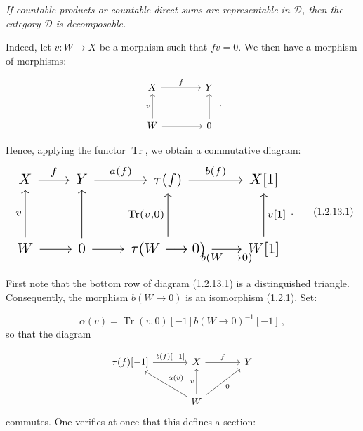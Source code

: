 \clearpage
{}%
\begingroup
\small
\setlength{\emergencystretch}{1.5em}%
\setlength{\abovedisplayskip}{4pt plus 2pt minus 2pt}%
\setlength{\belowdisplayskip}{4pt plus 2pt minus 2pt}%

\textit{If countable products or countable direct sums are representable
in $\mathcal D$, then the category $\mathcal D$ is decomposable.}

Indeed, let $v\colon W\longrightarrow X$ be a morphism such that $fv=0$.
We then have a morphism of morphisms:

\[
  \begin{tikzcd}[column sep=4em,row sep=2.5em]
    X \arrow[r,"f"] & Y \\
    W \arrow[u,"v"] \arrow[r] & 0 \arrow[u]
  \end{tikzcd}
  \,.
\]

Hence, applying the functor $\operatorname{Tr}$, we obtain a commutative
diagram:
\begin{equation}
  \resizebox{0.82\linewidth}{!}{%
    $\begin{tikzcd}[ampersand replacement=\&,column sep=2.05em,row sep=3em]
      X \arrow[r,"f"]
        \& Y \arrow[r,"{a(f)}"]
        \& \tau(f) \arrow[r,"{b(f)}"]
        \& X[1] \\
      W \arrow[u,"v"] \arrow[r]
        \& 0 \arrow[u] \arrow[r]
        \& \tau(W\longrightarrow 0) \arrow[u,"{\operatorname{Tr}(v,0)}"]
          \arrow[r,"{b(W\longrightarrow 0)}"']
        \& W[1] \arrow[u,"{v[1]}"']
    \end{tikzcd}$%
  }\,.
  \tag{1.2.13.1}
\end{equation}

First note that the bottom row of diagram (1.2.13.1) is a distinguished
triangle. Consequently, the morphism $b(W\longrightarrow 0)$ is an
isomorphism (1.2.1). Set:

\[
  \alpha(v)=\operatorname{Tr}(v,0)[-1]
  b(W\longrightarrow 0)^{-1}[-1]\,,
\]
so that the diagram

\[
  \begin{tikzcd}[column sep=3.5em,row sep=2.4em]
    \tau(f)[-1] \arrow[r,"{b(f)[-1]}"]
      & X \arrow[r,"f"]
      & Y \\
      & W \arrow[ul,"{\alpha(v)}"'] \arrow[u,"v"] \arrow[ur,"0"']
  \end{tikzcd}
\]
commutes. One verifies at once that this defines a section:
\par

